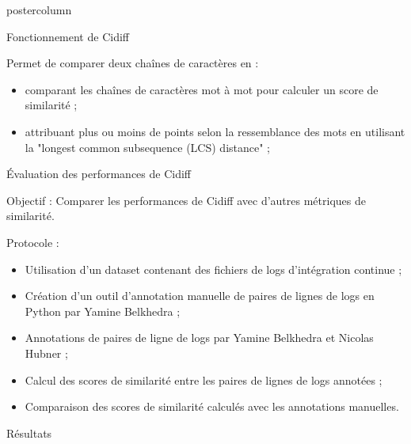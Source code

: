 \begin{frame}
\begin{columns}
\begin{column}{.49\textwidth}
\begin{beamercolorbox}[center,wd=\textwidth]{postercolumn}
\begin{minipage}[T]{.95\textwidth}
{            \begin{block}{Fonctionnement de Cidiff}
              
              Permet de comparer deux chaînes de caractères en :
            \begin{itemize}
              \item comparant les chaînes de caractères mot à mot pour calculer un score de similarité ;
              \item attribuant plus ou moins de points selon la ressemblance des mots en utilisant la "longest common subsequence (LCS) distance" ;
            \end{itemize}
            
            \end{block}
            
            \vfill
            
            \begin{block}{Évaluation des performances de Cidiff}
            
            Objectif : Comparer les performances de Cidiff avec d'autres métriques de similarité.

            Protocole :
            \begin{itemize}
              \item Utilisation d'un dataset contenant des fichiers de logs d'intégration continue ;
              \item Création d'un outil d'annotation manuelle de paires de lignes de logs en Python par Yamine Belkhedra ;
              \item Annotations de paires de ligne de logs par Yamine Belkhedra et Nicolas Hubner ;
              \item Calcul des scores de similarité entre les paires de lignes de logs annotées ;
              \item Comparaison des scores de similarité calculés avec les annotations manuelles.
            
            \end{itemize}
            
            \end{block}
            
            \vfill
            
            \begin{block}{Résultats}
              

\end{block}}
\end{minipage}
\end{beamercolorbox}
\end{column}
\end{columns}
\end{frame}
